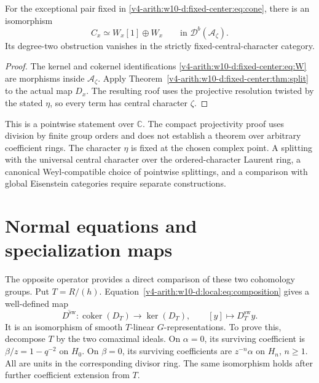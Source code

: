 \begin{proposition}\label{v4-arith:w10-d:fixed-center:prop:application}
For the exceptional pair fixed in \eqref{v4-arith:w10-d:fixed-center:eq:cone}, there is an isomorphism
\[
 C_x\simeq W_x[1]\oplus W_x
 \qquad\text{in }\mathcal D^b(\mathcal A_\zeta).
\]
Its degree-two obstruction vanishes in the strictly fixed-central-character category.
\end{proposition}
\begin{proof}
The kernel and cokernel identifications \eqref{v4-arith:w10-d:fixed-center:eq:W} are morphisms inside $\mathcal A_\zeta$.
Apply Theorem~\ref{v4-arith:w10-d:fixed-center:thm:split} to the actual map $D_x$.
The resulting roof uses the projective resolution twisted by the stated $\eta$,
so every term has central character $\zeta$.
\end{proof}

This is a pointwise statement over $\mathbb C$.
The compact projectivity proof uses division by finite group orders and does not establish a theorem over arbitrary coefficient rings.
The character $\eta$ is fixed at the chosen complex point.
A splitting with the universal central character over the ordered-character Laurent ring,
a canonical Weyl-compatible choice of pointwise splittings,
and a comparison with global Eisenstein categories require separate constructions.


\section{Normal equations and specialization maps}
The opposite operator provides a direct comparison of these two cohomology groups.
Put $T=R/(h)$.
Equation~\eqref{v4-arith:w10-d:local:eq:composition} gives a well-defined map
\[
 \overline {D^\mathrm{sw}}:\operatorname{coker}(D_T)\longrightarrow\ker(D_T),
 \qquad [y]\longmapsto D^\mathrm{sw}_Ty.
\]
It is an isomorphism of smooth $T$-linear $G$-representations.
To prove this, decompose $T$ by the two comaximal ideals.
On $\alpha=0$, its surviving coefficient is $\beta/z=1-q^{-2}$ on $H_0$.
On $\beta=0$, its surviving coefficients are $z^{-n}\alpha$ on $H_n$, $n\ge1$.
All are units in the corresponding divisor ring.
The same isomorphism holds after further coefficient extension from $T$.

